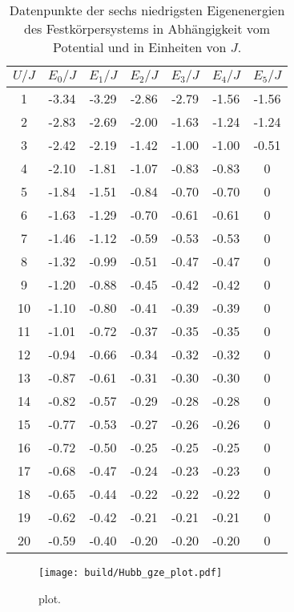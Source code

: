 \begin{table}[h]
  \centering
  \caption{Datenpunkte der sechs niedrigsten Eigenenergien des Festkörpersystems in Abhängigkeit vom Potential und in Einheiten von $J$.}
  \begin{tabular}{S[table-format=1.0] S[table-format=2.2] S[table-format=2.2] S[table-format=2.2] S[table-format=2.2] S[table-format=2.2] S[table-format=2.2]}
    \toprule
    {$U/J$} & {$E_0/J$} & {$E_1/J$} & {$E_2/J$} & {$E_3/J$} & {$E_4/J$} & {$E_5/J$} \\
      & -3.34 & -3.29 & -2.86 & -2.79 & -1.56 & -1.56 \\
    2  & -2.83 & -2.69 & -2.00 & -1.63 & -1.24 & -1.24 \\
    3  & -2.42 & -2.19 & -1.42 & -1.00 & -1.00 & -0.51 \\
    4  & -2.10 & -1.81 & -1.07 & -0.83 & -0.83 & 0     \\
    5  & -1.84 & -1.51 & -0.84 & -0.70 & -0.70 & 0     \\
    6  & -1.63 & -1.29 & -0.70 & -0.61 & -0.61 & 0     \\
    7  & -1.46 & -1.12 & -0.59 & -0.53 & -0.53 & 0     \\
    8  & -1.32 & -0.99 & -0.51 & -0.47 & -0.47 & 0     \\
    9  & -1.20 & -0.88 & -0.45 & -0.42 & -0.42 & 0     \\
    10 & -1.10 & -0.80 & -0.41 & -0.39 & -0.39 & 0     \\
    11 & -1.01 & -0.72 & -0.37 & -0.35 & -0.35 & 0     \\
    12 & -0.94 & -0.66 & -0.34 & -0.32 & -0.32 & 0     \\
    13 & -0.87 & -0.61 & -0.31 & -0.30 & -0.30 & 0     \\
    14 & -0.82 & -0.57 & -0.29 & -0.28 & -0.28 & 0     \\
    15 & -0.77 & -0.53 & -0.27 & -0.26 & -0.26 & 0     \\
    16 & -0.72 & -0.50 & -0.25 & -0.25 & -0.25 & 0     \\
    17 & -0.68 & -0.47 & -0.24 & -0.23 & -0.23 & 0     \\
    18 & -0.65 & -0.44 & -0.22 & -0.22 & -0.22 & 0     \\
    19 & -0.62 & -0.42 & -0.21 & -0.21 & -0.21 & 0     \\
    20 & -0.59 & -0.40 & -0.20 & -0.20 & -0.20 & 0     \\
    \bottomrule
  \end{tabular}
  \label{tab:eigenwerte}
\end{table}

\begin{figure}[H]
  \centering
  \texttt{[image: build/Hubb\_gze\_plot.pdf]}
  \caption{plot.}
  \label{fig:e0plot}
\end{figure}
